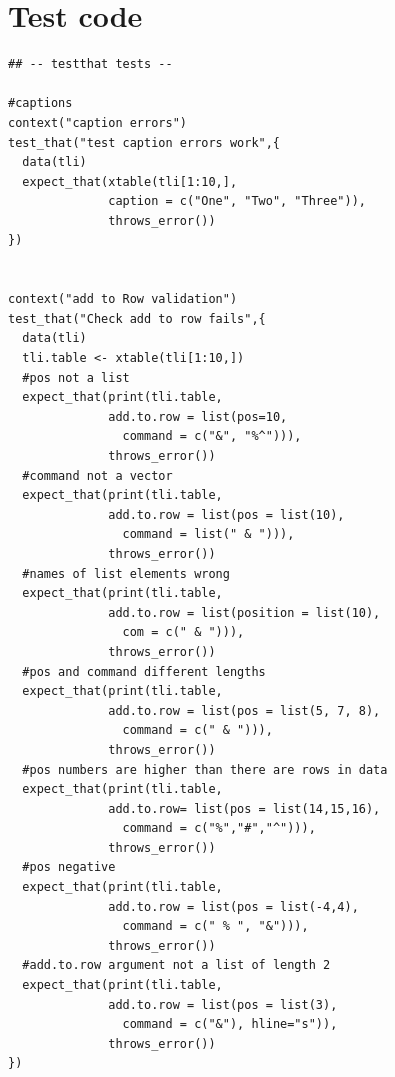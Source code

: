 \documentclass{memoir}\usepackage[]{graphicx}\usepackage[]{color}
\begin{document}
\renewcommand\thechapter{}
\chapter{Test code}

\begin{lstlisting}
## -- testthat tests --

#captions
context("caption errors")
test_that("test caption errors work",{
  data(tli)
  expect_that(xtable(tli[1:10,], 
              caption = c("One", "Two", "Three")), 
              throws_error())
})


context("add to Row validation")
test_that("Check add to row fails",{
  data(tli)
  tli.table <- xtable(tli[1:10,])
  #pos not a list
  expect_that(print(tli.table, 
              add.to.row = list(pos=10, 
                command = c("&", "%^"))),
              throws_error())
  #command not a vector
  expect_that(print(tli.table, 
              add.to.row = list(pos = list(10), 
                command = list(" & "))),
              throws_error())
  #names of list elements wrong
  expect_that(print(tli.table, 
              add.to.row = list(position = list(10), 
                com = c(" & "))),
              throws_error())
  #pos and command different lengths
  expect_that(print(tli.table, 
              add.to.row = list(pos = list(5, 7, 8), 
                command = c(" & "))),
              throws_error())
  #pos numbers are higher than there are rows in data
  expect_that(print(tli.table, 
              add.to.row= list(pos = list(14,15,16), 
                command = c("%","#","^"))),
              throws_error())
  #pos negative
  expect_that(print(tli.table, 
              add.to.row = list(pos = list(-4,4), 
                command = c(" % ", "&"))),
              throws_error())
  #add.to.row argument not a list of length 2
  expect_that(print(tli.table, 
              add.to.row = list(pos = list(3), 
                command = c("&"), hline="s")),
              throws_error())
})




\end{lstlisting}
\end{document}
